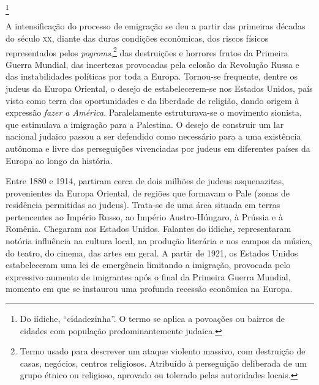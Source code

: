 
\footnote{Do iídiche, ``cidadezinha''. O termo se aplica a povoações ou bairros de cidades com população predominantemente judaica.} 

A intensificação do processo de emigração se deu a partir das primeiras décadas do século \textsc{xx}, diante das duras condições econômicas, dos riscos físicos representados pelos
\textit{pogroms},\footnote{Termo usado para descrever um ataque violento massivo, com destruição de casas, negócios, centros religiosos. Atribuído à perseguição deliberada de um grupo étnico ou religioso, aprovado ou tolerado pelas autoridades locais.} das destruições e horrores frutos da Primeira Guerra Mundial,
das incertezas provocadas pela eclosão da Revolução Russa e das
instabilidades políticas por toda a Europa. Tornou-se frequente, dentre os
judeus da Europa Oriental, o desejo de estabelecerem-se nos Estados
Unidos, país visto como terra das oportunidades e da liberdade de
religião, dando origem à expressão \textit{fazer a América}. Paralelamente estruturava-se o movimento sionista, que estimulava a imigração para a Palestina. O desejo de construir um lar nacional judaico passou a ser defendido como necessário para a uma existência autônoma e livre das perseguições vivenciadas por judeus em diferentes países da Europa ao longo da história.

Entre 1880 e 1914, partiram cerca de dois milhões de judeus
asquenazitas, provenientes da Europa Oriental, de regiões que formavam o
Pale (zonas de residência permitidas ao judeus). Trata-se de uma área
situada em terras pertencentes ao Império Russo, ao Império
Austro-Húngaro, à Prússia e à Romênia. Chegaram aos Estados Unidos.
Falantes do iídiche, representaram notória influência na cultura local,
na produção literária e nos campos da música, do teatro, do cinema, das
artes em geral. A partir de 1921, os Estados Unidos estabeleceram uma
lei de emergência limitando a imigração, provocada pelo expressivo
aumento de imigrantes após o final da Primeira Guerra Mundial, momento
em que se instaurou uma profunda recessão econômica na Europa.

